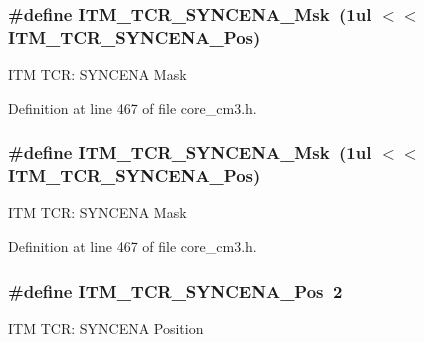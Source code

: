 \subsubsection[{\texorpdfstring{I\+T\+M\+\_\+\+T\+C\+R\+\_\+\+S\+Y\+N\+C\+E\+N\+A\+\_\+\+Msk}{ITM_TCR_SYNCENA_Msk}}]{\setlength{\rightskip}{0pt plus 5cm}\#define I\+T\+M\+\_\+\+T\+C\+R\+\_\+\+S\+Y\+N\+C\+E\+N\+A\+\_\+\+Msk~(1ul $<$$<$ I\+T\+M\+\_\+\+T\+C\+R\+\_\+\+S\+Y\+N\+C\+E\+N\+A\+\_\+\+Pos)}\hypertarget{group___c_m_s_i_s___c_m3___i_t_m_gac89b74a78701c25b442105d7fe2bbefb}{}\label{group___c_m_s_i_s___c_m3___i_t_m_gac89b74a78701c25b442105d7fe2bbefb}
I\+TM T\+CR\+: S\+Y\+N\+C\+E\+NA Mask 

Definition at line 467 of file core\+\_\+cm3.\+h.

\subsubsection[{\texorpdfstring{I\+T\+M\+\_\+\+T\+C\+R\+\_\+\+S\+Y\+N\+C\+E\+N\+A\+\_\+\+Msk}{ITM_TCR_SYNCENA_Msk}}]{\setlength{\rightskip}{0pt plus 5cm}\#define I\+T\+M\+\_\+\+T\+C\+R\+\_\+\+S\+Y\+N\+C\+E\+N\+A\+\_\+\+Msk~(1ul $<$$<$ I\+T\+M\+\_\+\+T\+C\+R\+\_\+\+S\+Y\+N\+C\+E\+N\+A\+\_\+\+Pos)}\hypertarget{group___c_m_s_i_s___c_m3___i_t_m_gac89b74a78701c25b442105d7fe2bbefb}{}\label{group___c_m_s_i_s___c_m3___i_t_m_gac89b74a78701c25b442105d7fe2bbefb}
I\+TM T\+CR\+: S\+Y\+N\+C\+E\+NA Mask 

Definition at line 467 of file core\+\_\+cm3.\+h.

\subsubsection[{\texorpdfstring{I\+T\+M\+\_\+\+T\+C\+R\+\_\+\+S\+Y\+N\+C\+E\+N\+A\+\_\+\+Pos}{ITM_TCR_SYNCENA_Pos}}]{\setlength{\rightskip}{0pt plus 5cm}\#define I\+T\+M\+\_\+\+T\+C\+R\+\_\+\+S\+Y\+N\+C\+E\+N\+A\+\_\+\+Pos~2}\hypertarget{group___c_m_s_i_s___c_m3___i_t_m_gaa93a1147a39fc63980d299231252a30e}{}\label{group___c_m_s_i_s___c_m3___i_t_m_gaa93a1147a39fc63980d299231252a30e}
I\+TM T\+CR\+: S\+Y\+N\+C\+E\+NA Position 

